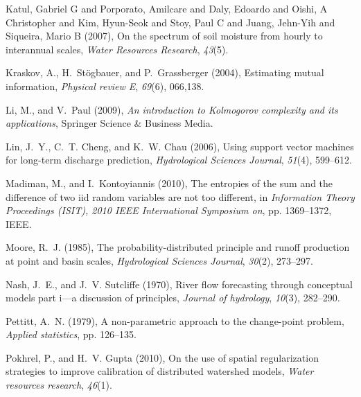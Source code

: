 \documentclass[draft,wrr]{AGUTeX}
\begin{document}
\begin{article}
\begin{thebibliography}{59}
Katul, Gabriel G and Porporato, Amilcare and Daly, Edoardo and Oishi, A Christopher and Kim, Hyun-Seok and Stoy, Paul C and Juang, Jehn-Yih and Siqueira, Mario B (2007), On the spectrum of soil moisture from hourly to interannual scales, \textit{Water Resources Research},
  \textit{43}(5).

Kraskov, A., H.~St{\"o}gbauer, and P.~Grassberger (2004), Estimating mutual
  information, \textit{Physical review E}, \textit{69}(6), 066,138.

Li, M., and V.~Paul (2009), \textit{An introduction to Kolmogorov complexity
  and its applications}, Springer Science \& Business Media.

Lin, J.~Y., C.~T. Cheng, and K.~W. Chau (2006), Using support vector machines
  for long-term discharge prediction, \textit{Hydrological Sciences Journal},
  \textit{51}(4), 599--612.

Madiman, M., and I.~Kontoyiannis (2010), The entropies of the sum and the
  difference of two iid random variables are not too different, in
  \textit{Information Theory Proceedings (ISIT), 2010 IEEE International
  Symposium on}, pp. 1369--1372, IEEE.

Moore, R.~J. (1985), The probability-distributed principle and runoff
  production at point and basin scales, \textit{Hydrological Sciences Journal},
  \textit{30}(2), 273--297.

Nash, J.~E., and J.~V. Sutcliffe (1970), River flow forecasting through
  conceptual models part i—a discussion of principles, \textit{Journal of
  hydrology}, \textit{10}(3), 282--290.

Pettitt, A.~N. (1979), A non-parametric approach to the change-point problem,
  \textit{Applied statistics}, pp. 126--135.

Pokhrel, P., and H.~V. Gupta (2010), On the use of spatial regularization
  strategies to improve calibration of distributed watershed models,
  \textit{Water resources research}, \textit{46}(1).


\end{thebibliography}
\end{article}
\end{document}
